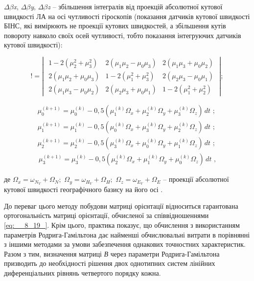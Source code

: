 $\Delta $$\beta $\textit{x}, $\Delta $$\beta $\textit{y}, $\Delta $$\beta $\textit{z }-- збільшення 
інтегралів від проекцій абсолютної кутової швидкості ЛА на осі чутливості гіроскопів 
(показання датчиків кутової швидкості БІНС, які вимірюють не проекції кутових швидкостей, 
а збільшення кутів повороту навколо своїх осей чутливості, тобто показання інтегруючих 
датчиків кутової швидкості):

\[!=\left|\, \, \begin{array}{ccc} {1-2(\mu_{2}^{2} +\mu_{3}^{2} )} & {2(\mu_{1} 
\mu_{2} -\mu_{0} \mu_{3} )} & {2(\mu_{1} \mu_{3} +\mu_{0} \mu_{2} )} \\ {2(
\mu_{1} \mu_{2} +\mu_{0} \mu_{3} )} & {1-2(\mu_{1}^{2} +\mu_{3}^{2} )} & {2(
\mu_{2} \mu_{3} -\mu_{0} \mu_{1} )} \\ {2(\mu_{1} \mu_{3} -\mu_{0} \mu_{2} 
)} & {2(\mu_{2} \mu_{3} +\mu_{0} \mu_{1} )} & {1-2(\mu_{1}^{2} +\mu_{2}^{2} 
)} \end{array}\, \, \right|;\] 



\[\begin{array}{l} {\mu_{0}^{(k+1)} =\mu_{0}^{(k)} -0,5\left(\mu_{1}^{(k)} \Omega 
_{x} +\mu_{2}^{(k)} \Omega_{y} +\mu_{3}^{(k)} \Omega_{z} \right)\, dt\, \, ;} 
\\ {\mu_{1}^{(k+1)} =\mu_{1}^{(k)} -0,5\left(\mu_{0}^{(k)} \Omega_{x} +\mu_{3}^{(k)} 
\Omega_{y} +\mu_{2}^{(k)} \Omega_{z} \right)\, dt\, \, ;} \\ {\mu_{2}^{(k+1)} 
=\mu_{2}^{(k)} -0,5\left(\mu_{3}^{(k)} \Omega_{x} +\mu_{0}^{(k)} \Omega_{y} 
+\mu_{1}^{(k)} \Omega_{z} \right)\, dt\, \, ;} \\ {\, \mu_{3}^{(k+1)} =\mu_{3}^{(k)} 
-0,5\left(\mu_{2}^{(k)} \Omega_{x} +\mu_{1}^{(k)} \Omega_{y} +\mu_{0}^{(k)} 
\Omega_{z} \right)\, dt\, \, ,} \end{array}\] 

де $\Omega_{x} =\omega_{N_{V} } +\Omega_{N} ;\, \, \Omega_{y} =\omega_{H_{V} 
} +\Omega_{H} ;\, \, \Omega_{z} =\omega_{E_{V} } +\Omega_{E} $ -- проекції абсолютної 
кутової швидкості географічного базису на його осі .

До переваг цього методу побудови матриці орієнтації відноситься гарантована ортогональність 
матриці орієнтації, обчисленої за співвідношеннями \eqref{eq:__8_19_}. Крім цього, 
практика показує, що обчислення з використанням параметрів Родрига-Гамільтона дає 
найменші обчислювальні витрати в порівнянні з іншими методами за умови забезпечення 
однакових точностних характеристик. Разом з тим, визначення матриці \textit{В }через 
параметри Родрига-Гамільтона призводить до необхідності рішення двох однотипних систем 
лінійних диференціальних рівнянь четвертого порядку кожна.

